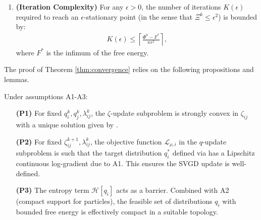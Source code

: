 \begin{theorem}
\begin{enumerate}
    \item \textbf{(Iteration Complexity)} For any $\epsilon > 0$, the number of iterations $K(\epsilon)$ required to reach an $\epsilon$-stationary point (in the sense that $\Xi^k \le \epsilon^2$) is bounded by:
    \begin{equation}
    \begin{aligned}
    K(\epsilon) \le \left\lceil \frac{\Phi^0 - F^*}{\kappa \epsilon^2} \right\rceil,
    \label{eq:iteration_complexity}
    \end{aligned}
    \end{equation}
    where $F^*$ is the infimum of the free energy.
\end{enumerate}
\end{theorem}

The proof of Theorem \ref{thm:convergence} relies on the following propositions and lemmas.

\begin{proposition}
\label{prop:subproblems}
Under assumptions A1-A3:
\begin{enumerate}
    \item[\textbf{(P1)}] For fixed $q_i^k, q_j^k, \lambda_{ij}^k$, the $\zeta$-update subproblem  is strongly convex in $\zeta_{ij}$ with a unique solution given by .
    \item[\textbf{(P2)}] For fixed $\zeta_{ij}^{k+1}, \lambda_{ij}^k$, the objective function ${\mathcal{L}}_{\rho, i}$ in the $q$-update subproblem  is such that the target distribution $q_i^*$ defined via  has a Lipschitz continuous log-gradient due to A1. This ensures the SVGD update is well-defined.
    \item[\textbf{(P3)}] The entropy term ${\mathcal{H}}[q_i]$ acts as a barrier. Combined with A2 (compact support for particles), the feasible set of distributions $q_i$ with bounded free energy is effectively compact in a suitable topology.
\end{enumerate}
\end{proposition}

